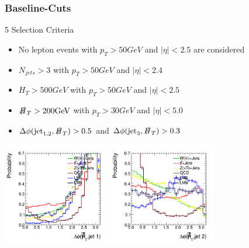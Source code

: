  
\begin{frame}
	\frametitle{Baseline-Cuts}
	\begin{block}{5 Selection Criteria}
		\begin{itemize}
			\item No lepton events with  $p_T > 50 \si{ GeV}$ and $\lvert\eta\rvert < 2.5$ are considered
			\item $N_{\si{jets}} > 3$ with $p_T > 50 \si{ GeV}$ and $\lvert\eta\rvert < 2.4$
			\item $H_T > 500\si{GeV}$ with $p_T > 50 \si{ GeV}$ and $\lvert\eta\rvert < 2.5$
			\item $\slashed{H}_T > 200\si{GeV}$ with $p_T > 30 \si{GeV}$ and $\lvert\eta\rvert < 5.0$	
			\item $\Delta\phi(\si{jet}_{1,2},\slashed{H}_T) > 0.5$ and  $\Delta\phi(\si{jet}_3,\slashed{H}_T) > 0.3$
		\end{itemize}
	\end{block}
	
	\begin{center}
		\includegraphics[width = 0.35\textwidth]{plots10/hDeltaPhi1.png}
		\includegraphics[width = 0.35\textwidth]{plots10/hDeltaPhi2.png}
	\end{center}
	
\end{frame}


